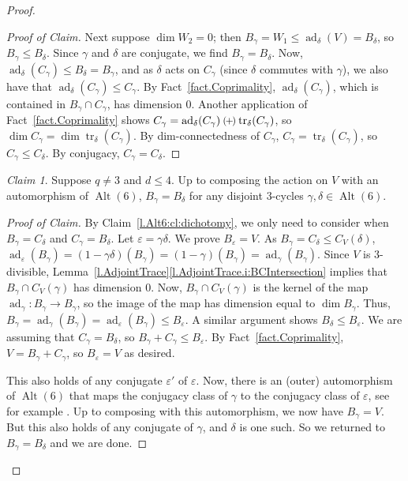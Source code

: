 \documentclass[a4paper, 11pt]{amsart}
\theoremstyle{plain}
\theoremstyle{definition}
\theoremstyle{remark}
\newtheorem{claim}{Claim}
\newenvironment{proofclaim}[1][Proof of Claim]{\begin{proof}[#1]\renewcommand{\qedsymbol}{$\lozenge$}}{\end{proof}}
\newcommand{\qoplus}{\mathbin{\scalerel*{\left(\mkern-2mu+\mkern-2mu\right)}{\bigcirc}}}
\DeclareMathOperator{\ad}{ad}
\DeclareMathOperator{\tr}{tr}
\DeclareMathOperator{\Alt}{Alt}
\begin{document}
\begin{proof}
\begin{proofclaim}
Next suppose $\dim W_2 = 0$; then $B_\gamma = W_1 \le \ad_\delta(V) = B_\delta$, so $B_\gamma \le B_\delta$. Since $\gamma$ and $\delta$ are conjugate, we find $B_\gamma = B_\delta$. 
Now, $\ad_\delta(C_\gamma) \le B_\delta = B_\gamma$, and as $\delta$ acts on $C_\gamma$ (since $\delta$ commutes with $\gamma$), we also have that $\ad_\delta(C_\gamma) \le C_\gamma$. By Fact~\ref{fact.Coprimality}, $\ad_\delta(C_\gamma)$, which is contained in  $B_\gamma\cap C_\gamma$, has dimension $0$. Another application of Fact~\ref{fact.Coprimality} shows $C_\gamma = \ad_\delta(C_\gamma)\qoplus \tr_\delta(C_\gamma)$, so $\dim C_\gamma = \dim \tr_\delta(C_\gamma)$. By dim-connectedness of $C_\gamma$, $C_\gamma = \tr_\delta(C_\gamma)$, so  $C_\gamma\le C_\delta$. By conjugacy, $C_\gamma = C_\delta$.
\end{proofclaim}

\begin{claim}\label{l.Alt6:cl:outer}
Suppose $q\ne 3$ and $d \le 4$.  Up to composing the action  on $V$ with an automorphism of $\Alt(6)$, $B_\gamma = B_\delta$ for any  disjoint $3$-cycles $\gamma,\delta \in \Alt(6)$. 
\end{claim}
\begin{proofclaim}
By Claim~\ref{l.Alt6:cl:dichotomy}, we only need to consider when $B_\gamma = C_\delta$ and $C_\gamma = B_\delta$.
Let $\varepsilon = \gamma \delta$. We prove $B_\varepsilon = V$.
As $B_\gamma = C_\delta\le C_V(\delta)$, $\ad_\varepsilon(B_\gamma) = (1-\gamma\delta)(B_\gamma) = (1-\gamma)(B_\gamma) = \ad_\gamma(B_\gamma)$. Since $V$ is $3$-divisible, Lemma~\ref{l.AdjointTrace}\eqref{l.AdjointTrace.i:BCIntersection} implies that  $B_\gamma \cap C_V(\gamma)$ has dimension $0$. Now, $B_\gamma \cap C_V(\gamma)$ is the kernel of the map $\ad_\gamma : B_\gamma \rightarrow B_\gamma$, so the image of the map has dimension equal to $\dim B_\gamma$. Thus, $B_\gamma = \ad_\gamma(B_\gamma) = \ad_\varepsilon(B_\gamma)\le B_\varepsilon$. A similar argument shows  $B_\delta  \le B_\varepsilon$. We are assuming that $C_\gamma = B_\delta$, so $B_\gamma + C_\gamma \le B_\varepsilon$. By Fact~\ref{fact.Coprimality}, $V = B_\gamma + C_\gamma$, so $B_\varepsilon = V$ as desired.

This also holds of any conjugate $\varepsilon'$ of $\varepsilon$.
Now, there is an (outer) automorphism of $\Alt(6)$ that maps the conjugacy class of $\gamma$  to the conjugacy class of $\varepsilon$, see for example \cite{JR82}.
Up to composing with this automorphism, we now have $B_\gamma = V$. But this also holds of any conjugate of $\gamma$, and $\delta$ is one such. So we returned to $B_\gamma = B_\delta$ and we are done.
\end{proofclaim}


\end{proof}
\end{document}
